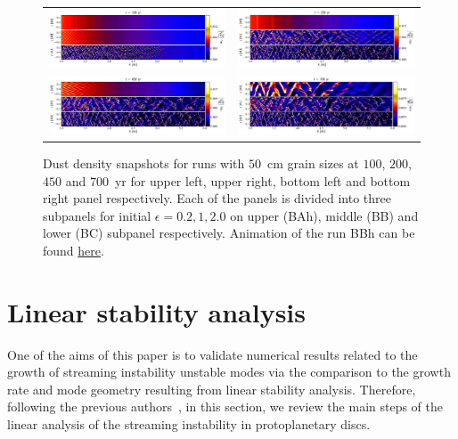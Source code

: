 %
\begin{figure}
   \centering
   \begin{tabular}{@{}cc@{}}
      \includegraphics[width=0.49\linewidth]{figures/fig1a} & 
      \includegraphics[width=0.49\linewidth]{figures/fig1b} \\
      \includegraphics[width=0.49\linewidth]{figures/fig1c} &
      \includegraphics[width=0.49\linewidth]{figures/fig1d}
   \end{tabular}
   \caption{Dust density snapshots for runs with $50$~cm grain sizes at $100$,
   $200$, $450$ and $700$~yr for upper left, upper right, bottom left and bottom
   right panel respectively. Each of the panels is divided into three subpanels
   for initial $\epsilon = 0.2, 1, 2.0$ on upper (BAh), middle (BB) and lower
   (BC) subpanel respectively. Animation of the run BBh can be found 
   \href{http://youtu.be/EfQU8ixHFbU}{here}.}
   \label{fig1}
\end{figure}
%
\section{Linear stability analysis}
\label{sec:lsa}
%
One of the aims of this paper is to validate numerical results related to the
growth of streaming instability unstable modes via the comparison to the growth
rate and mode geometry resulting from linear stability analysis. Therefore,
following the previous authors~\citep{YG05}, in this section, we review the main
steps of the linear analysis of the streaming instability in protoplanetary
discs.

